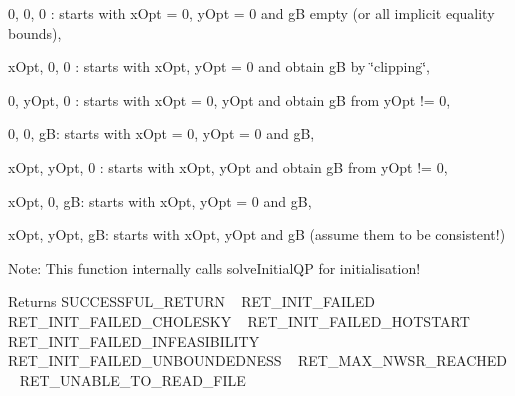 \begin{DoxyEnumerate}
\item 0, 0, 0 \+: starts with x\+Opt = 0, y\+Opt = 0 and gB empty (or all implicit equality bounds), ~\newline

\item x\+Opt, 0, 0 \+: starts with x\+Opt, y\+Opt = 0 and obtain gB by \char`\"{}clipping\char`\"{}, ~\newline

\item 0, y\+Opt, 0 \+: starts with x\+Opt = 0, y\+Opt and obtain gB from y\+Opt != 0, ~\newline

\item 0, 0, gB\+: starts with x\+Opt = 0, y\+Opt = 0 and gB, ~\newline

\item x\+Opt, y\+Opt, 0 \+: starts with x\+Opt, y\+Opt and obtain gB from y\+Opt != 0, ~\newline

\item x\+Opt, 0, gB\+: starts with x\+Opt, y\+Opt = 0 and gB, ~\newline

\item x\+Opt, y\+Opt, gB\+: starts with x\+Opt, y\+Opt and gB (assume them to be consistent!)
\end{DoxyEnumerate}

Note\+: This function internally calls solve\+Initial\+QP for initialisation!

\begin{DoxyReturn}{Returns}
S\+U\+C\+C\+E\+S\+S\+F\+U\+L\+\_\+\+R\+E\+T\+U\+RN ~\newline
 R\+E\+T\+\_\+\+I\+N\+I\+T\+\_\+\+F\+A\+I\+L\+ED ~\newline
 R\+E\+T\+\_\+\+I\+N\+I\+T\+\_\+\+F\+A\+I\+L\+E\+D\+\_\+\+C\+H\+O\+L\+E\+S\+KY ~\newline
 R\+E\+T\+\_\+\+I\+N\+I\+T\+\_\+\+F\+A\+I\+L\+E\+D\+\_\+\+H\+O\+T\+S\+T\+A\+RT ~\newline
 R\+E\+T\+\_\+\+I\+N\+I\+T\+\_\+\+F\+A\+I\+L\+E\+D\+\_\+\+I\+N\+F\+E\+A\+S\+I\+B\+I\+L\+I\+TY ~\newline
 R\+E\+T\+\_\+\+I\+N\+I\+T\+\_\+\+F\+A\+I\+L\+E\+D\+\_\+\+U\+N\+B\+O\+U\+N\+D\+E\+D\+N\+E\+SS ~\newline
 R\+E\+T\+\_\+\+M\+A\+X\+\_\+\+N\+W\+S\+R\+\_\+\+R\+E\+A\+C\+H\+ED ~\newline
 R\+E\+T\+\_\+\+U\+N\+A\+B\+L\+E\+\_\+\+T\+O\+\_\+\+R\+E\+A\+D\+\_\+\+F\+I\+LE 
\end{DoxyReturn}

